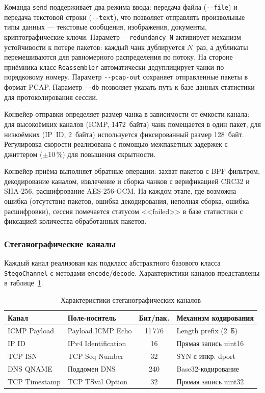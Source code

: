 Команда \texttt{send} поддерживает два режима ввода: передача файла (\texttt{-{}-file}) и передача текстовой строки (\texttt{-{}-text}), что позволяет отправлять произвольные типы данных --- текстовые сообщения, изображения, документы, криптографические ключи. Параметр \texttt{-{}-redundancy~N} активирует механизм устойчивости к потере пакетов: каждый чанк дублируется $N$~раз, а дубликаты перемешиваются для равномерного распределения по потоку. На стороне приёмника класс \texttt{Reassembler} автоматически дедуплицирует чанки по порядковому номеру. Параметр \texttt{-{}-pcap-out} сохраняет отправленные пакеты в формат PCAP. Параметр \texttt{-{}-db} позволяет указать путь к базе данных статистики для протоколирования сессии.

Конвейер отправки определяет размер чанка в зависимости от ёмкости канала: для высокоёмких каналов (ICMP, 1472~байта) чанк помещается в один пакет, для низкоёмких (IP~ID, 2~байта) используется фиксированный размер 128~байт. Регулировка скорости реализована с помощью межпакетных задержек с джиттером ($\pm10$\,\%) для повышения скрытности.

Конвейер приёма выполняет обратные операции: захват пакетов с BPF-фильтром, декодирование каналом, извлечение и сборка чанков с верификацией CRC32 и SHA-256, расшифрование AES-256-GCM. На каждом этапе, где возможна ошибка (отсутствие пакетов, ошибка декодирования, неполная сборка, ошибка расшифровки), сессия помечается статусом <<failed>> в базе статистики с фиксацией количества обработанных пакетов.

\subsubsection{Стеганографические каналы}

Каждый канал реализован как подкласс абстрактного базового класса \texttt{StegoChannel} с методами \texttt{encode}/\texttt{decode}. Характеристики каналов представлены в таблице~\ref{tab:channels}.

\begin{table}[htb]
\centering
\caption{Характеристики стеганографических каналов}
\label{tab:channels}
\small
\begin{tabular}{|l|l|c|l|}
\hline
Канал & Поле-носитель & Бит/пак. & Механизм кодирования \\
\hline
ICMP Payload   & Payload ICMP Echo & 11\,776 & Length prefix (2~Б) \\
IP ID          & IPv4 Identification & 16 & Прямая запись uint16 \\
TCP ISN        & TCP Seq Number & 32 & SYN с инкр. dport \\
DNS QNAME      & Поддомен DNS & 240 & Base32-кодирование \\
TCP Timestamp  & TCP TSval Option & 32 & Прямая запись uint32 \\
\hline
\end{tabular}
\end{table}


